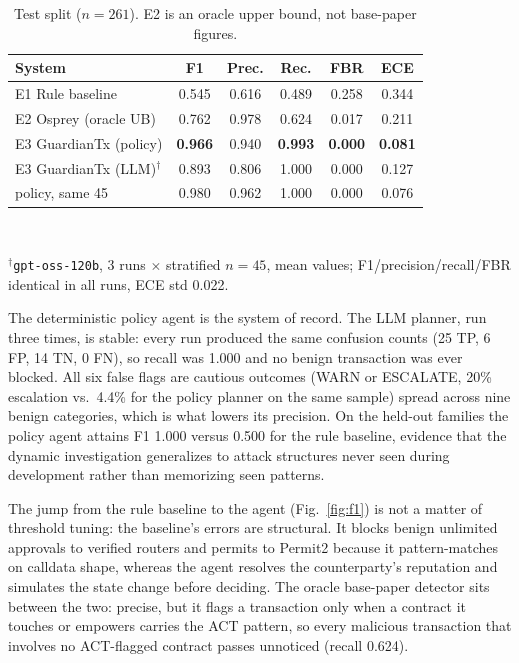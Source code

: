 \documentclass[conference]{IEEEtran}
\begin{document}
\begin{table}[t]
\caption{Test split ($n=261$). E2 is an oracle upper bound, not base-paper figures.}
\label{tab:main}
\centering
\small
\begin{tabular}{@{}lccccc@{}}
\toprule
System & F1 & Prec. & Rec. & FBR & ECE \\
\midrule
E1 Rule baseline        & 0.545 & 0.616 & 0.489 & 0.258 & 0.344 \\
E2 Osprey (oracle UB)   & 0.762 & 0.978 & 0.624 & 0.017 & 0.211 \\
E3 GuardianTx (policy)  & \textbf{0.966} & 0.940 & \textbf{0.993} & \textbf{0.000} & \textbf{0.081} \\
E3 GuardianTx (LLM)$^\dagger$ & 0.893 & 0.806 & 1.000 & 0.000 & 0.127 \\
\quad policy, same 45 & 0.980 & 0.962 & 1.000 & 0.000 & 0.076 \\
\bottomrule
\end{tabular}
\\[2pt]
\raggedright\footnotesize $^\dagger$\texttt{gpt-oss-120b}, 3 runs $\times$ stratified
$n=45$, mean values; F1/precision/recall/FBR identical in all runs, ECE std 0.022.
\end{table}

The deterministic policy agent is the system of record. The LLM planner, run three
times, is stable: every run produced the same confusion counts (25 TP, 6 FP, 14 TN,
0 FN), so recall was 1.000 and no benign transaction was ever blocked. All six false
flags are cautious outcomes (WARN or ESCALATE, 20\% escalation vs.\ 4.4\% for the
policy planner on the same sample) spread across nine benign categories, which is
what lowers its precision. On the held-out families the policy agent attains F1 1.000 versus
0.500 for the rule baseline, evidence that the dynamic investigation generalizes to
attack structures never seen during development rather than memorizing seen patterns.

The jump from the rule baseline to the agent (Fig.~\ref{fig:f1}) is not a matter of
threshold tuning: the baseline's errors are structural. It blocks benign unlimited
approvals to verified routers and permits to Permit2 because it pattern-matches on
calldata shape, whereas the agent resolves the counterparty's reputation and
simulates the state change before deciding. The oracle base-paper detector sits
between the two: precise, but it flags a transaction only when a contract it touches
or empowers carries the ACT pattern, so every malicious transaction that involves no
ACT-flagged contract passes unnoticed (recall 0.624).
\end{document}
